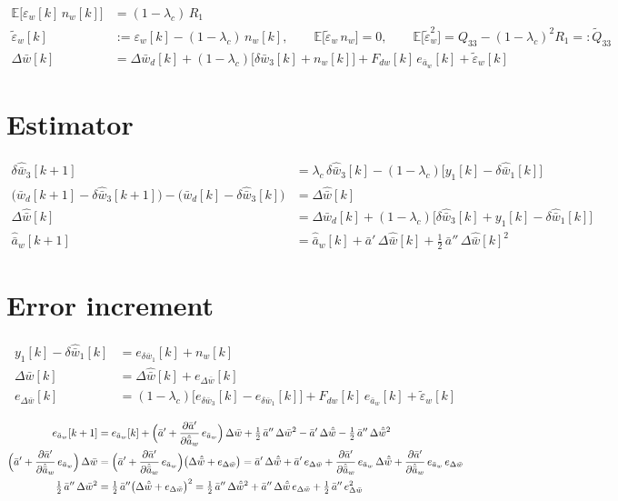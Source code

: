 \documentclass[11pt,a4paper,fontset=none]{ctexart}
\newcommand{\ba}{\bar{a}}
\newcommand{\bw}{\bar{w}}
\newcommand{\E}{\mathbb{E}}
\newcommand{\dW}{\Delta\bw}
\newcommand{\dWh}{\Delta\hat{\bw}}
\newcommand{\eD}{e_{\Delta\bw}}
\newcommand{\ap}{\ba'}
\newcommand{\app}{\ba''}
\newcommand{\et}{\tilde{\varepsilon}_w}
\newcommand{\dap}{\frac{\partial\ap}{\partial\hat{\ba}_w}}
\begin{document}
\begin{align*}
\E\bigl[\varepsilon_w[k]\,n_w[k]\bigr] &= (1-\lambda_c)\,R_1 \\
\et[k] &:= \varepsilon_w[k] - (1-\lambda_c)\,n_w[k] , \qquad
\E\bigl[\et\,n_w\bigr] = 0 , \qquad
\E\bigl[\et^{2}\bigr] = Q_{33} - (1-\lambda_c)^{2}R_1 =: \tilde{Q}_{33} \\
\dW[k] &= \Delta\bw_d[k] + (1-\lambda_c)\bigl[\delta\bw_3[k] + n_w[k]\bigr] + F_{dw}[k]\,e_{\ba_w}[k] + \et[k]
\end{align*}

\section{Estimator}

\begin{align*}
\delta\hat{\bw}_3[k+1] &= \lambda_c\,\delta\hat{\bw}_3[k] - (1-\lambda_c)\bigl[y_1[k] - \delta\hat{\bw}_1[k]\bigr] \\
\bigl(\bw_d[k+1] - \delta\hat{\bw}_3[k+1]\bigr) - \bigl(\bw_d[k] - \delta\hat{\bw}_3[k]\bigr) &= \dWh[k] \\
\dWh[k]                &= \Delta\bw_d[k] + (1-\lambda_c)\bigl[\delta\hat{\bw}_3[k] + y_1[k] - \delta\hat{\bw}_1[k]\bigr] \\
\hat{\ba}_w[k+1] &= \hat{\ba}_w[k] + \ap\,\dWh[k] + \tfrac{1}{2}\,\app\,\dWh[k]^{2}
\end{align*}

\clearpage
\section{Error increment}

\begin{align*}
y_1[k] - \delta\hat{\bw}_1[k] &= e_{\delta\bw_1}[k] + n_w[k] \\
\dW[k] &= \dWh[k] + \eD[k] \\
\eD[k] &= (1-\lambda_c)\bigl[e_{\delta\bw_3}[k] - e_{\delta\bw_1}[k]\bigr] + F_{dw}[k]\,e_{\ba_w}[k] + \et[k]
\end{align*}

\begin{align*}
e_{\ba_w}[k+1] &= e_{\ba_w}[k]
  + \Bigl(\ap + \dap\,e_{\ba_w}\Bigr)\,\dW + \tfrac{1}{2}\,\app\,\dW^{2}
  - \ap\,\dWh - \tfrac{1}{2}\,\app\,\dWh^{2} \\
\Bigl(\ap + \dap\,e_{\ba_w}\Bigr)\,\dW
  &= \Bigl(\ap + \dap\,e_{\ba_w}\Bigr)\bigl(\dWh + \eD\bigr)
   = \ap\,\dWh + \ap\,\eD + \dap\,e_{\ba_w}\,\dWh + \dap\,e_{\ba_w}\,\eD \\
\tfrac{1}{2}\,\app\,\dW^{2}
  &= \tfrac{1}{2}\,\app\bigl(\dWh + \eD\bigr)^{2}
   = \tfrac{1}{2}\,\app\,\dWh^{2} + \app\,\dWh\,\eD + \tfrac{1}{2}\,\app\,\eD^{2}
\end{align*}
\end{document}
